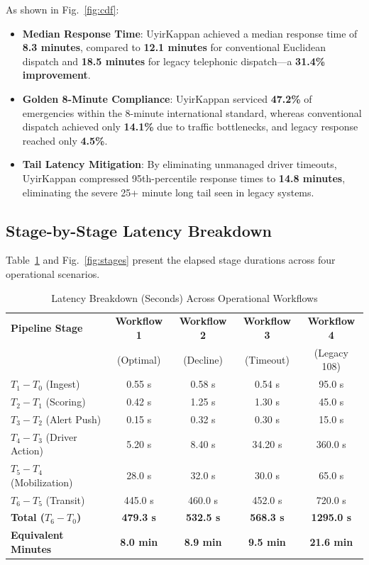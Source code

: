 \documentclass[conference]{IEEEtran}
\begin{document}
As shown in Fig.~\ref{fig:cdf}:
\begin{itemize}
    \item \textbf{Median Response Time}: UyirKappan achieved a median response time of \textbf{8.3 minutes}, compared to \textbf{12.1 minutes} for conventional Euclidean dispatch and \textbf{18.5 minutes} for legacy telephonic dispatch—a \textbf{31.4\% improvement}.
    \item \textbf{Golden 8-Minute Compliance}: UyirKappan serviced \textbf{47.2\%} of emergencies within the 8-minute international standard, whereas conventional dispatch achieved only \textbf{14.1\%} due to traffic bottlenecks, and legacy response reached only \textbf{4.5\%}.
    \item \textbf{Tail Latency Mitigation}: By eliminating unmanaged driver timeouts, UyirKappan compressed 95th-percentile response times to \textbf{14.8 minutes}, eliminating the severe 25+ minute long tail seen in legacy systems.
\end{itemize}

\subsection{Stage-by-Stage Latency Breakdown}
Table~\ref{tab:latency} and Fig.~\ref{fig:stages} present the elapsed stage durations across four operational scenarios.

\begin{table}[htbp]
\caption{Latency Breakdown (Seconds) Across Operational Workflows}
\label{tab:latency}
\centering
\scriptsize
\begin{tabularx}{\columnwidth}{lcccc}
\toprule
\textbf{Pipeline Stage} & \textbf{Workflow 1} & \textbf{Workflow 2} & \textbf{Workflow 3} & \textbf{Workflow 4} \\
 & (Optimal) & (Decline) & (Timeout) & (Legacy 108) \\
\midrule
$T_1 - T_0$ (Ingest) & 0.55 s & 0.58 s & 0.54 s & 95.0 s \\
$T_2 - T_1$ (Scoring) & 0.42 s & 1.25 s & 1.30 s & 45.0 s \\
$T_3 - T_2$ (Alert Push) & 0.15 s & 0.32 s & 0.30 s & 15.0 s \\
$T_4 - T_3$ (Driver Action) & 5.20 s & 8.40 s & 34.20 s & 360.0 s \\
$T_5 - T_4$ (Mobilization) & 28.0 s & 32.0 s & 30.0 s & 65.0 s \\
$T_6 - T_5$ (Transit) & 445.0 s & 460.0 s & 452.0 s & 720.0 s \\
\midrule
\textbf{Total ($T_6 - T_0$)} & \textbf{479.3 s} & \textbf{532.5 s} & \textbf{568.3 s} & \textbf{1295.0 s} \\
\textbf{Equivalent Minutes} & \textbf{8.0 min} & \textbf{8.9 min} & \textbf{9.5 min} & \textbf{21.6 min} \\
\bottomrule
\end{tabularx}
\end{table}
\end{document}
